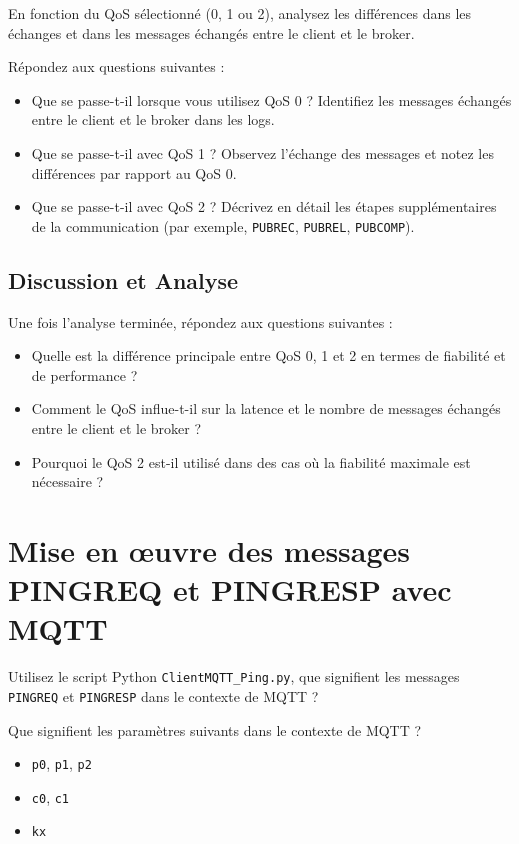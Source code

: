 \documentclass{article}
\begin{document}
En fonction du QoS sélectionné (0, 1 ou 2), analysez les différences dans les échanges et dans les messages échangés entre le client et le broker.

Répondez aux questions suivantes :

\begin{itemize}
    \item Que se passe-t-il lorsque vous utilisez QoS 0 ? Identifiez les messages échangés entre le client et le broker dans les logs.
    \item Que se passe-t-il avec QoS 1 ? Observez l'échange des messages et notez les différences par rapport au QoS 0.
    \item Que se passe-t-il avec QoS 2 ? Décrivez en détail les étapes supplémentaires de la communication (par exemple, \texttt{PUBREC}, \texttt{PUBREL}, \texttt{PUBCOMP}).
\end{itemize}

\subsection{Discussion et Analyse}

Une fois l'analyse terminée, répondez aux questions suivantes :
\begin{itemize}
    \item Quelle est la différence principale entre QoS 0, 1 et 2 en termes de fiabilité et de performance ?
    \item Comment le QoS influe-t-il sur la latence et le nombre de messages échangés entre le client et le broker ?
    \item Pourquoi le QoS 2 est-il utilisé dans des cas où la fiabilité maximale est nécessaire ?
\end{itemize}

\section{Mise en œuvre des messages PINGREQ et PINGRESP avec MQTT}

Utilisez le script Python \texttt{ClientMQTT\_Ping.py}, que signifient les messages \texttt{PINGREQ} et \texttt{PINGRESP} dans le contexte de MQTT ?

Que signifient les paramètres suivants dans le contexte de MQTT ?

\begin{itemize}
    \item \texttt{p0}, \texttt{p1}, \texttt{p2}
    \item \texttt{c0}, \texttt{c1}
    \item \texttt{kx}
\end{itemize}
\end{document}
